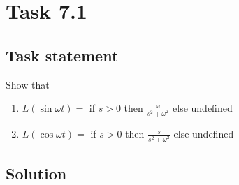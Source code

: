 \section*{Task 7.1}

\subsection*{Task statement} Show that 
\begin{enumerate}
    \item $L(\sin{\omega t}) =$ if $s > 0$ then $\frac{\omega}{s^2 + \omega^2}$ else undefined
    \item $L(\cos{\omega t}) =$ if $s > 0$ then $\frac{s}{s^2 + \omega^2}$ else undefined
\end{enumerate}

\subsection*{Solution}

